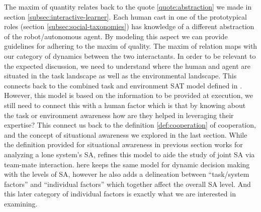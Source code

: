 \documentclass[letterpaper, 10 pt, conference]{ieeeconf}  %
\theoremstyle{definition}
\begin{document}
The maxim of quantity relates back to the quote \ref{quote:abstraction} we made in section \ref{subsec:interactive-learner}.
Each human cast in one of the prototypical roles (section \ref{subsec:social-taxonomies}) has knowledge of a different abstraction of the robot/autonomous agent.
By modeling this aspect we can provide guidelines for adhering to the maxim of quality.
The maxim of relation maps with our category of dynamics between the two interactants.
In order to be relevant to the expected discussion, we need to understand where the human and agent are situated in the task landscape as well as the environmental landscape.
This connects back to the combined task and environment SAT model defined in \cite{chen2014situation}.
However, this model is based on the information to be provided at execution, we still need to connect this with a human factor which is that by knowing about the task or environment awareness how are they helped in leveraging their expertise?
This connect us back to the definition \ref{def:cooperation} of cooperation, and the concept of situational awareness we explored in the last section.
While the definition provided for situational awareness in previous section works for analyzing a lone system's SA, \cite{Endsley1995} refines this model to aide the study of joint SA via team-mate interaction.
\citeauthor{Endsley1995} here keeps the same model for dynamic decision making with the levels of SA, however he also adds a delineation between ``task/system factors'' and ``individual factors'' which together affect the overall SA level.
And this later category of individual factors is exactly what we are interested in examining.

\end{document}
